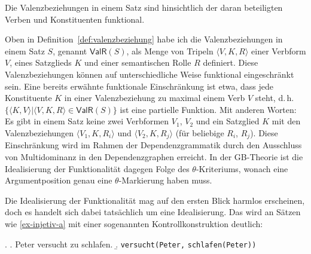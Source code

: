 \begin{idealisierung} 
Die Valenzbeziehungen in einem Satz sind hinsichtlich der daran beteiligten Verben und Konstituenten funktional. 
\end{idealisierung} 
Oben in Definition~\ref{def:valenzbeziehung} habe ich die Valenzbeziehungen in einem Satz $S$, genannt $\mathsf{ValR}(S)$, als Menge von Tripeln $\langle V, K, R \rangle$ einer Verbform $V$, eines Satzglieds $K$ und einer semantischen Rolle $R$ definiert. Diese Valenzbeziehungen können auf unterschiedliche Weise funktional eingeschränkt sein. Eine bereits erwähnte funktionale Einschränkung ist etwa, dass jede Konstituente $K$ in einer Valenzbeziehung zu maximal einem Verb $V$ steht, d.\,h.\ $\{\langle K,V \rangle | \langle V,K,R \rangle \in \mathsf{ValR}(S) \}$ ist eine partielle Funktion. Mit anderen Worten: Es gibt in einem Satz keine zwei Verbformen $V_1$, $V_2$ und ein Satzglied $K$ mit den Valenzbeziehungen $\langle V_1, K, R_i \rangle$ und $\langle V_2, K, R_j\rangle$ (für beliebige $R_i$, $R_j$). Diese Einschränkung wird im Rahmen der Dependenzgrammatik durch den Ausschluss von Multidominanz in den Dependenzgraphen erreicht. In der GB-Theorie ist die Idealisierung der Funktionalität dagegen Folge des $\theta$-Kriteriums, wonach eine Argumentposition genau eine $\theta$-Markierung haben muss.

Die Idealisierung der Funktionalität mag auf den ersten Blick harmlos erscheinen, doch es handelt sich dabei tatsächlich um eine Idealisierung. Das wird an Sätzen wie \ref{ex-injetiv-a} mit einer sogenannten Kontrollkonstruktion deutlich: 

\ex. \label{ex-injetiv} 
\a. \label{ex-injetiv-a} Peter versucht zu schlafen.
\b. \label{ex-injetiv-b} {\tt versucht(Peter,} {\tt schlafen(Peter))}

